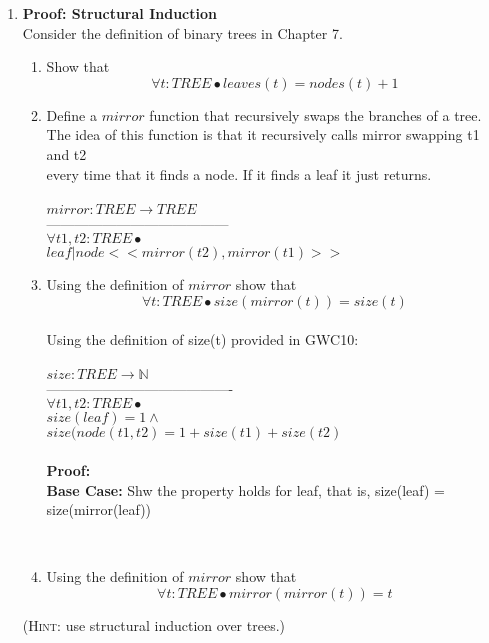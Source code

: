 \documentclass{article}
\begin{document}
\begin{enumerate}[\bf I.]
\item \textbf{Proof: Structural Induction} \\[8pt]
Consider the definition of binary trees in Chapter 7.
\begin{enumerate}
\item Show that
\[\forall t: TREE \bullet leaves(t) = nodes(t) + 1\]
\item Define a $mirror$ function that recursively swaps the branches of a tree. \\
  The idea of this function is that it recursively calls mirror swapping t1 and t2 \\
  every time that it finds a node. If it finds a leaf it just returns. \\
  \\
  $ mirror: TREE \rightarrow TREE $\\
  --------------------------------------- \\
  $\forall t1,t2 : TREE \bullet$\\
  $leaf | node <<mirror(t2),mirror(t1)>>$ \\
\item Using the definition of $mirror$  show
that
\[\forall t: TREE \bullet size(mirror(t)) = size(t)\] \\
Using the definition of size(t) provided in GWC10: \\
\\
$ size: TREE \rightarrow \mathbb{N} $\\
---------------------------------------- \\
$ \forall t1,t2: TREE \bullet $\\
$ size (leaf) = 1 \land $\\
$ size (node(t1,t2) = 1 + size(t1) + size(t2) $ \\
\\
\textbf{Proof:}\\
\textbf{Base Case:} Shw the property holds for leaf, that is, size(leaf) = size(mirror(leaf)) \\
 \\

\item Using the definition of $mirror$ show that
\[\forall t: TREE \bullet mirror(mirror(t)) = t\]
\end{enumerate}
(\textsc{Hint}: use structural induction over trees.)


\end{enumerate}
\end{document}
